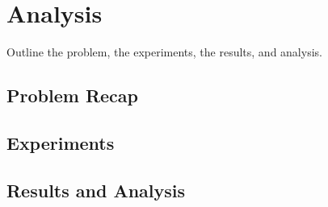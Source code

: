 \chapter{Analysis}

Outline the problem, the experiments, the results, and analysis.

\section{Problem Recap}

\section{Experiments}

\section{Results and Analysis}
